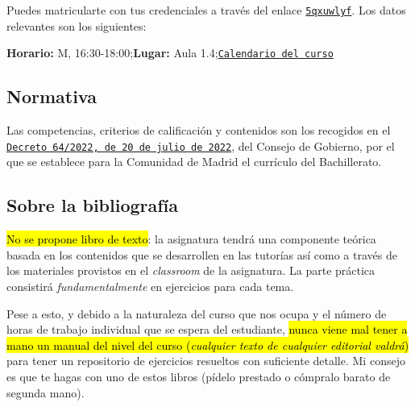 \documentclass[a5paper,12pt]{extarticle}
\begin{document}
	Puedes matricularte con tus credenciales a través del enlace \href{https://classroom.google.com/c/ODA2NTEwNjk5MTc0?cjc=5qxuwlyf}{\nolinkurl{5qxuwlyf}}. Los datos relevantes son los siguientes:
	
	\vspace{2ex}
	

 \textbf{Horario:} M, 16:30-18:00;\hspace{.3cm}\textbf{Lugar:} Aula 1.4;\hspace{.3cm}\href{https://iesjaimeferran.org/wp-content/uploads/calendario-Distancia-26-27.pdf}{\texttt{Calendario del curso}}

	
	\subsection{Normativa}
Las competencias, criterios de calificación y contenidos son los recogidos en el \href{https://www.bocm.es/boletin/CM_Orden_BOCM/2022/07/26/BOCM-20220726-1.PDF}{\texttt{Decreto 64/2022, de 20 de julio de 2022}}, del Consejo de Gobierno, por el que se establece para la Comunidad de Madrid el currículo del Bachillerato.
\vspace{1ex}

	
	\subsection{Sobre la bibliografía}
 \hl{No se propone libro de texto}: la asignatura tendrá una componente teórica basada en los contenidos que se desarrollen en las tutorías así como a través de los materiales provistos en el \textit{classroom} de la asignatura. 
 La parte práctica consistirá \textit{fundamentalmente} en ejercicios para cada tema.
\vspace{1ex}

Pese a esto, y debido a la naturaleza del curso que nos ocupa y el número de horas de trabajo individual que se espera del estudiante, \hl{nunca viene mal tener a mano un manual del nivel del curso (\textit{cualquier texto de cualquier editorial valdr\'a})} para tener un repositorio de ejercicios resueltos con suficiente detalle. Mi consejo es que te hagas con uno de estos libros (pídelo prestado o cómpralo barato de segunda mano).
\end{document}
